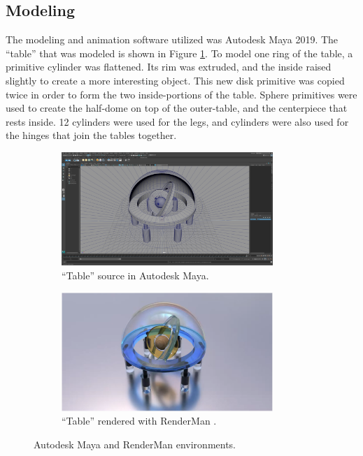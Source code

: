 \documentclass[conference]{IEEEtran}
\begin{document}
\subsection{Modeling}
The modeling and animation software utilized was Autodesk Maya 2019.
The ``table'' that was modeled is shown in Figure \ref{fig:environment}.
To model one ring of the table, a primitive cylinder was flattened.
Its rim was extruded, and the inside raised slightly to create a more interesting object.
This new disk primitive was copied twice in order to form the two inside-portions of the table.
Sphere primitives were used to create the half-dome on top of the outer-table, and the centerpiece
that rests inside. 12 cylinders were used for the legs, and cylinders were also used
for the hinges that join the tables together.

\begin{figure}[h!]
\centering
\begin{subfigure}{.5\textwidth}
\begin{center}
\begin{minipage}[t]{\linewidth}
\centerline{\includegraphics[width=8cm]{project1.png}}
\caption{``Table'' source in Autodesk Maya.}
\label{fig:environment}
\end{minipage}
\end{center}
\end{subfigure}
\par\bigskip
\begin{subfigure}{.5\textwidth}
\begin{center}
\begin{minipage}[t]{\linewidth}
\centerline{\includegraphics[width=8cm]{table.png}}
\caption{``Table'' rendered with RenderMan \cite{animation}.}
\label{fig:table}
\end{minipage}
\end{center}
\end{subfigure}
\caption{Autodesk Maya and RenderMan environments.}
\label{fig:table_pair}
\end{figure}
\end{document}
